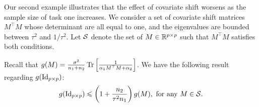 Our second example illustrates that the effect of covariate shift worsens as the sample size of task one increases.
We consider a set of covariate shift matrices $M^{\top} M$ whose determinant are all equal to one, and the eigenvalues are bounded between $\tau^2$ and $1 / \tau^2$.
Let $\mathcal{S}$ denote the set of $M\in\mathbb{R}^{p\times p}$ such that $M^{\top} M$ satisfies both conditions.
\begin{claim}\label{prop_covariate}
    Recall that $g(M) = \frac{\sigma^2}{n_1 + n_2} \operatorname{Tr}\left[\frac 1 {\alpha_1 M^{\top} M + \alpha_2}\right]$.
	We have the following result regarding $g(\operatorname{Id}_{p \times p})$:
	\begin{align} g(\id_{p\times p}) \le \bigbrace{1+ {\frac{n_2}{\tau^2 n_1}  }} g(M), \text{ for any } M \in \cS. \label{eq_claim_id}
	\end{align}
\end{claim}
